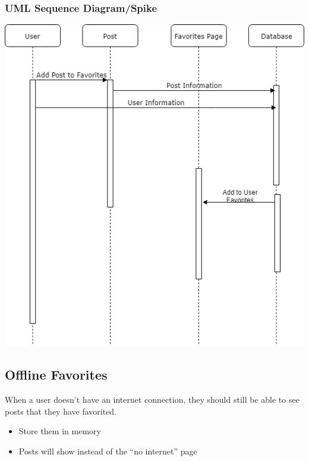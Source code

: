 \documentclass[12pt]{article}
\begin{document}
\subsubsection{UML Sequence Diagram/Spike}
\includegraphics[scale=0.5]{img/8.png}\linebreak

\subsection{Offline Favorites}
When a user doesn’t have an internet connection, they should still be able to
see posts that they have favorited.
\begin{itemize}
  \item Store them in memory
  \item Posts will show instead of the “no internet” page
\end{itemize}
\end{document}
